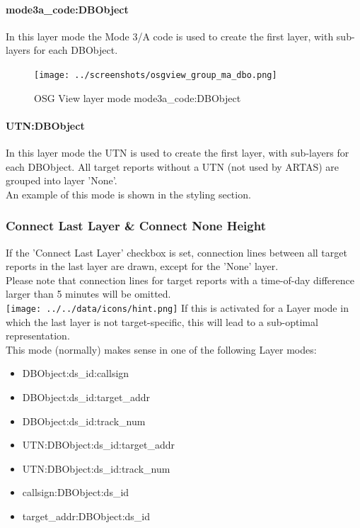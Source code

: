 \paragraph{mode3a\_code:DBObject}

In this layer mode the Mode 3/A code is used to create the first layer, with sub-layers for each DBObject.

\begin{figure}[H]
\center
    \texttt{[image: ../screenshots/osgview\_group\_ma\_dbo.png]}
  \caption{OSG View layer mode mode3a\_code:DBObject}
\end{figure}

\paragraph{UTN:DBObject}

In this layer mode the UTN is used to create the first layer, with sub-layers for each DBObject. All target reports without a UTN (not used by ARTAS) are grouped into layer 'None'.  \\

An example of this mode is shown in the styling section.


\subsubsection{Connect Last Layer \& Connect None Height}

If the 'Connect Last Layer' checkbox is set, connection lines between all target reports in the last layer are drawn, except for the 'None' layer. \\

Please note that connection lines for target reports with a time-of-day difference larger than 5 minutes will be omitted. \\

\texttt{[image: ../../data/icons/hint.png]} If this is activated for a Layer mode in which the last layer is not target-specific, this will lead to a sub-optimal representation. \\

This mode (normally) makes sense in one of the following Layer modes:

\begin{itemize}
 \item DBObject:ds\_id:callsign
 \item DBObject:ds\_id:target\_addr
 \item DBObject:ds\_id:track\_num
 \item UTN:DBObject:ds\_id:target\_addr
 \item UTN:DBObject:ds\_id:track\_num
 \item callsign:DBObject:ds\_id 
 \item target\_addr:DBObject:ds\_id
\end{itemize}
\  \\

